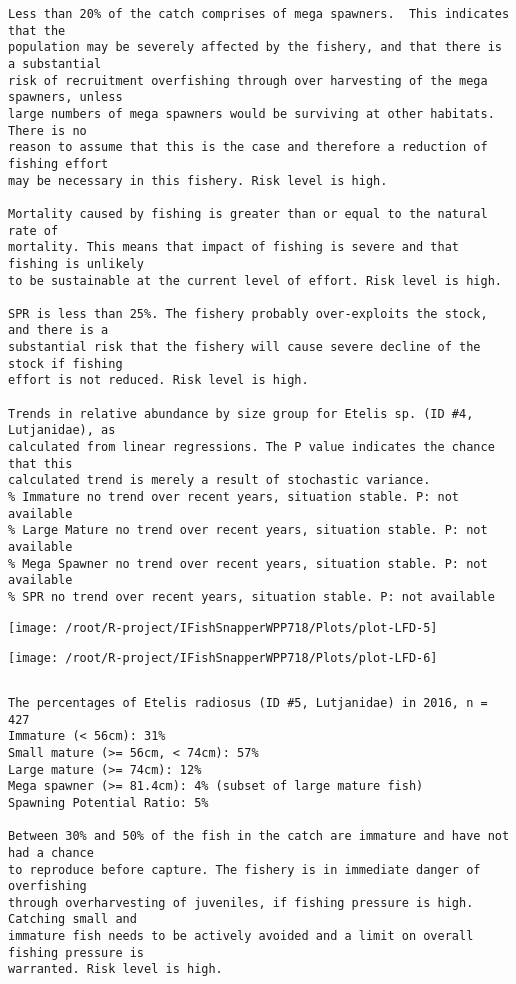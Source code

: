 \documentclass{report}\usepackage[]{graphicx}\usepackage[]{color}
\makeatletter
\def\maxwidth{ %
  \ifdim\Gin@nat@width>\linewidth
    \linewidth
  \else
    \Gin@nat@width
  \fi
}
\newenvironment{kframe}{%
 \def\at@end@of@kframe{}%
 \ifinner\ifhmode%
  \def\at@end@of@kframe{\end{minipage}}%
  \begin{minipage}{\columnwidth}%
 \fi\fi%
 \def\FrameCommand##1{\hskip\@totalleftmargin \hskip-\fboxsep
 \colorbox{shadecolor}{##1}\hskip-\fboxsep
     \hskip-\linewidth \hskip-\@totalleftmargin \hskip\columnwidth}%
 \MakeFramed {\advance\hsize-\width
   \@totalleftmargin\z@ \linewidth\hsize
   \@setminipage}}%
 {\par\unskip\endMakeFramed%
 \at@end@of@kframe}
\newenvironment{knitrout}{}{} %
\makeatother
\begin{document}
\begin{knitrout}
\begin{kframe}
\begin{verbatim}
Less than 20% of the catch comprises of mega spawners.  This indicates that the
population may be severely affected by the fishery, and that there is a substantial
risk of recruitment overfishing through over harvesting of the mega spawners, unless
large numbers of mega spawners would be surviving at other habitats. There is no
reason to assume that this is the case and therefore a reduction of fishing effort
may be necessary in this fishery. Risk level is high.
 
Mortality caused by fishing is greater than or equal to the natural rate of
mortality. This means that impact of fishing is severe and that fishing is unlikely
to be sustainable at the current level of effort. Risk level is high.
 
SPR is less than 25%. The fishery probably over-exploits the stock, and there is a
substantial risk that the fishery will cause severe decline of the stock if fishing
effort is not reduced. Risk level is high.
 
Trends in relative abundance by size group for Etelis sp. (ID #4, Lutjanidae), as
calculated from linear regressions. The P value indicates the chance that this
calculated trend is merely a result of stochastic variance.
% Immature no trend over recent years, situation stable. P: not available
% Large Mature no trend over recent years, situation stable. P: not available
% Mega Spawner no trend over recent years, situation stable. P: not available
% SPR no trend over recent years, situation stable. P: not available
\end{verbatim}
\end{kframe}
\texttt{[image: /root/R-project/IFishSnapperWPP718/Plots/plot-LFD-5]} 

\texttt{[image: /root/R-project/IFishSnapperWPP718/Plots/plot-LFD-6]} 
\begin{kframe}\begin{verbatim}
\end{verbatim}
\end{kframe}
\clearpage
\newpage
\begin{kframe}\begin{verbatim}The percentages of Etelis radiosus (ID #5, Lutjanidae) in 2016, n = 427
Immature (< 56cm): 31%
Small mature (>= 56cm, < 74cm): 57%
Large mature (>= 74cm): 12%
Mega spawner (>= 81.4cm): 4% (subset of large mature fish)
Spawning Potential Ratio: 5%
 
Between 30% and 50% of the fish in the catch are immature and have not had a chance
to reproduce before capture. The fishery is in immediate danger of overfishing
through overharvesting of juveniles, if fishing pressure is high.  Catching small and
immature fish needs to be actively avoided and a limit on overall fishing pressure is
warranted. Risk level is high.


\end{verbatim}
\end{kframe}
\end{knitrout}
\end{document}
